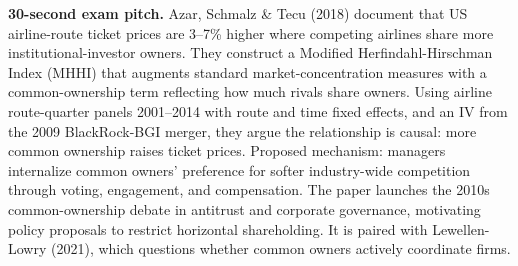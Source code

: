 \documentclass[11pt]{article}
\begin{document}
\begin{keybox}
\textbf{30-second exam pitch.} Azar, Schmalz \& Tecu (2018) document that US airline-route ticket prices are 3--7\% higher where competing airlines share more institutional-investor owners. They construct a Modified Herfindahl-Hirschman Index (MHHI) that augments standard market-concentration measures with a common-ownership term reflecting how much rivals share owners. Using airline route-quarter panels 2001--2014 with route and time fixed effects, and an IV from the 2009 BlackRock-BGI merger, they argue the relationship is causal: more common ownership raises ticket prices. Proposed mechanism: managers internalize common owners' preference for softer industry-wide competition through voting, engagement, and compensation. The paper launches the 2010s common-ownership debate in antitrust and corporate governance, motivating policy proposals to restrict horizontal shareholding. It is paired with Lewellen-Lowry (2021), which questions whether common owners actively coordinate firms.
\end{keybox}
\end{document}
